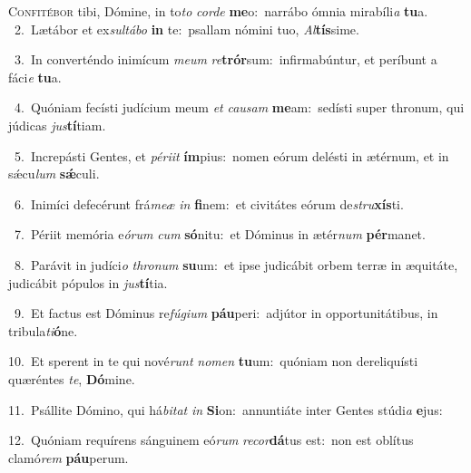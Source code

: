 \lettrine{\initial\textcolor{\initialcolor}{C}}{onfitébor} tibi, Dómine, in to\textit{to} \textit{cor}\-\textit{de} \textbf{me}\-o:~\star narrábo ómnia mirabíli\textit{a} \textbf{tu}\-a.\\
{\numbfont\textcolor{\numbcolor}{~2.}}~Lætábor et ex\-\textit{sul}\-\textit{tá}\textit{bo} \textbf{in} te:~\star psallam nómini tuo, \textit{Al}\-\textbf{tís}sime.\par
{\numbfont\textcolor{\numbcolor}{~3.}}~In converténdo inimícum \textit{me}\-\textit{um} \textit{re}\-\textbf{trór}sum:~\star infirmabúntur, et períbunt a fáci\textit{e} \textbf{tu}\-a.\par
{\numbfont\textcolor{\numbcolor}{~4.}}~Quóniam fecísti judícium meum \textit{et} \textit{cau}\-\textit{sam} \textbf{me}\-am:~\star sedísti super thronum, qui júdicas \textit{jus}\-\textbf{tí}tiam.\par
{\numbfont\textcolor{\numbcolor}{~5.}}~Increpásti Gentes, et \textit{pér}\-\textit{i}\textit{it} \textbf{ím}\-pius:~\star nomen eórum delésti in ætérnum, et in sǽcu\textit{lum} \textbf{sǽ}\-culi.\par
{\numbfont\textcolor{\numbcolor}{~6.}}~Inimíci defecérunt frá\-\textit{me}\-\textit{æ} \textit{in} \textbf{fi}\-nem:~\star et civitátes eórum de\-\textit{stru}\-\textbf{xís}ti.\par
{\numbfont\textcolor{\numbcolor}{~7.}}~Périit memória e\-\textit{ó}\-\textit{rum} \textit{cum} \textbf{só}\-nitu:~\star et Dóminus in ætér\textit{num} \textbf{pér}\-manet.\par
{\numbfont\textcolor{\numbcolor}{~8.}}~Parávit in judíci\textit{o} \textit{thro}\-\textit{num} \textbf{su}\-um:~\star et ipse judicábit orbem terræ in æquitáte, judicábit pópulos in \textit{jus}\-\textbf{tí}tia.\par
{\numbfont\textcolor{\numbcolor}{~9.}}~Et factus est Dóminus re\-\textit{fú}\-\textit{gi}\textit{um} \textbf{páu}\-peri:~\star adjútor in opportunitátibus, in tribula\-\textit{ti}\-\textbf{ó}ne.\par
{\numbfont\textcolor{\numbcolor}{10.}}~Et sperent in te qui nové\textit{runt} \textit{no}\-\textit{men} \textbf{tu}\-um:~\star quóniam non dereliquísti quæréntes \textit{te}\-, \textbf{Dó}\-mine.\par
{\numbfont\textcolor{\numbcolor}{11.}}~Psállite Dómino, qui há\-\textit{bi}\-\textit{tat} \textit{in} \textbf{Si}\-on:~\star annuntiáte inter Gentes stúdi\textit{a} \textbf{e}\-jus:\par
{\numbfont\textcolor{\numbcolor}{12.}}~Quóniam requírens sánguinem eó\textit{rum} \textit{re}\-\textit{cor}\textbf{dá}tus est:~\star non est oblítus clamó\textit{rem} \textbf{páu}\-perum.\par
